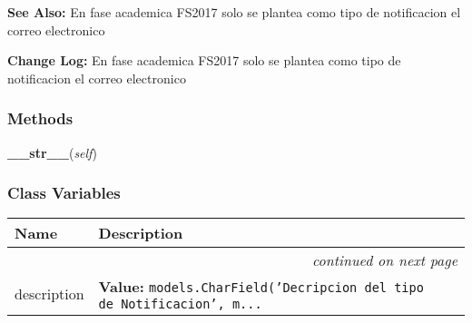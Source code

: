 \textbf{See Also:} En fase academica FS2017 solo se plantea como tipo de notificacion el 
correo electronico



\textbf{Change Log:} En fase academica FS2017 solo se plantea como tipo de notificacion el 
correo electronico





  \subsubsection{Methods}

    \label{GroundSegment:models:Notification:NotificationType:NotificationType:__str__}

    \vspace{0.5ex}

\hspace{.8\funcindent}\begin{boxedminipage}{\funcwidth}

    \raggedright \textbf{\_\_str\_\_}(\textit{self})

\setlength{\parskip}{2ex}
\setlength{\parskip}{1ex}
    \end{boxedminipage}



  \subsubsection{Class Variables}

    \vspace{-1cm}
\hspace{\varindent}\begin{longtable}{|p{\varnamewidth}|p{\vardescrwidth}|l}
\cline{1-2}
\cline{1-2} \centering \textbf{Name} & \centering \textbf{Description}& \\
\cline{1-2}
\endhead\cline{1-2}\multicolumn{3}{r}{\small\textit{continued on next page}}\\\endfoot\cline{1-2}
\endlastfoot\raggedright d\-e\-s\-c\-r\-i\-p\-t\-i\-o\-n\- & \raggedright \textbf{Value:} 
{\tt models.CharField('Decripcion del tipo de Notificacion', m\texttt{...}}&\\
\cline{1-2}
\end{longtable}


